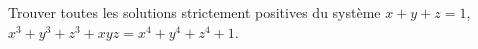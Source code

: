 Trouver toutes les solutions strictement positives du système $x + y + z = 1$, $x^3 + y^3 + z^3 + xyz = x^4 + y^4 + z^4 + 1$.
